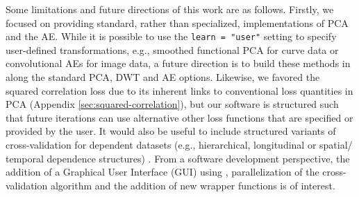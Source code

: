 Some limitations and future directions of this work are as follows.
Firstly, we focused on providing standard, rather than specialized, implementations of PCA and the AE.
While it is possible to use the \texttt{learn = "user"} setting to specify user-defined transformations, e.g., smoothed functional PCA for curve data or convolutional AEs for image data, a future direction is to build these methods in along the standard PCA, DWT and AE options.
Likewise, we favored the squared correlation loss due to its inherent links to conventional loss quantities in PCA (Appendix \ref{sec:squared-correlation}), but our software is structured such that future iterations can use alternative other loss functions \parencite[e.g., concordance index, see][]{yang_quantile_2020} that are specified or provided by the user.
It would also be useful to include structured variants of cross-validation for dependent datasets (e.g., hierarchical, longitudinal or spatial/ temporal dependence structures) \parencite{bergmeir_note_2018, hornung_evaluating_2023, roberts_cross-validation_2017}.
From a software development perspective, the addition of a Graphical User Interface (GUI) using  \parencite{chang_shiny_2021}, parallelization of the cross-validation algorithm and the addition of new wrapper functions is of interest.
